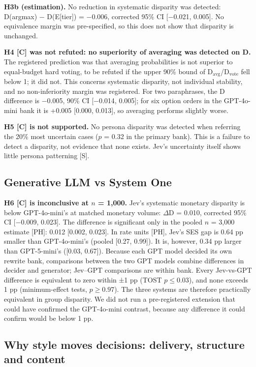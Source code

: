 \textbf{H3b (estimation).} No reduction in systematic disparity was detected: D(argmax) − D(E[tier]) = −0.006, corrected 95\% CI [−0.021, 0.005]. No equivalence margin was pre-specified, so this does not show that disparity is unchanged.

\textbf{H4 [C] was not refuted: no superiority of averaging was detected on D.} The registered prediction was that averaging probabilities is not superior to equal-budget hard voting, to be refuted if the upper 90\% bound of D$_\text{avg}$/D$_\text{vote}$ fell below 1; it did not. This concerns systematic disparity, not individual stability, and no non-inferiority margin was registered. For two paraphrases, the D difference is −0.005, 90\% CI [−0.014, 0.005]; for six option orders in the GPT-4o-mini bank it is +0.005 [0.000, 0.013], so averaging performs slightly worse.

\textbf{H5 [C] is not supported.} No persona disparity was detected when referring the 20\% most uncertain cases ($p$ = 0.32 in the primary bank). This is a failure to detect a disparity, not evidence that none exists. Jev's uncertainty itself shows little persona patterning [S].


\subsection{Generative LLM vs System One}

\textbf{H6 [C] is inconclusive at $n$ = 1,000.} Jev's systematic monetary disparity is below GPT-4o-mini's at matched monetary volume: $\Delta$D = 0.010, corrected 95\% CI [−0.009, 0.023]. The difference is significant only in the pooled $n$ = 3,000 estimate [PH]: 0.012 [0.002, 0.023]. In rate units [PH], Jev's SES gap is 0.64 pp smaller than GPT-4o-mini's (pooled [0.27, 0.99]). It is, however, 0.34 pp larger than GPT-5-mini's ([0.03, 0.67]). Because each GPT model decided its own rewrite bank, comparisons between the two GPT models combine differences in decider and generator; Jev--GPT comparisons are within bank. Every Jev-vs-GPT difference is equivalent to zero within ±1 pp (TOST $p \le 0.03$), and none exceeds 1 pp (minimum-effect tests, $p \ge 0.97$). The three systems are therefore practically equivalent in group disparity. We did not run a pre-registered extension that could have confirmed the GPT-4o-mini contrast, because any difference it could confirm would be below 1 pp.

\subsection{Why style moves decisions: delivery, structure and content}

